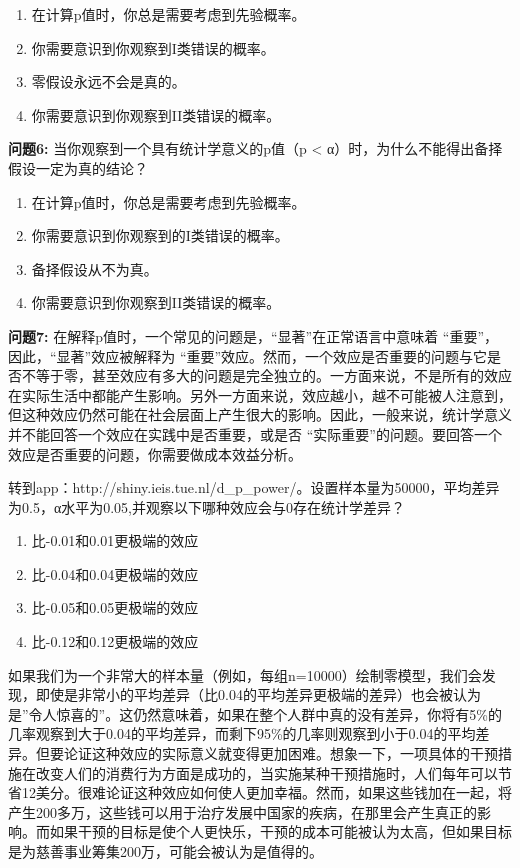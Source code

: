 \documentclass[
  letterpaper,
  DIV=11,
  numbers=noendperiod]{scrreprt}
\providecommand{\tightlist}{%
  \setlength{\itemsep}{0pt}\setlength{\parskip}{0pt}}\usepackage{longtable,booktabs,array}
\begin{document}
\begin{enumerate}
\def\labelenumi{\Alph{enumi})}
\tightlist
\item
  在计算p值时，你总是需要考虑到先验概率。
\item
  你需要意识到你观察到I类错误的概率。
\item
  零假设永远不会是真的。
\item
  你需要意识到你观察到II类错误的概率。
\end{enumerate}

\textbf{问题6:} 当你观察到一个具有统计学意义的p值（p \textless{}
α）时，为什么不能得出备择假设一定为真的结论？

\begin{enumerate}
\def\labelenumi{\Alph{enumi})}
\tightlist
\item
  在计算p值时，你总是需要考虑到先验概率。
\item
  你需要意识到你观察到的I类错误的概率。
\item
  备择假设从不为真。
\item
  你需要意识到你观察到II类错误的概率。
\end{enumerate}

\textbf{问题7:}
在解释p值时，一个常见的问题是，``显著''在正常语言中意味着
``重要''，因此，``显著''效应被解释为
``重要''效应。然而，一个效应是否重要的问题与它是否不等于零，甚至效应有多大的问题是完全独立的。一方面来说，不是所有的效应在实际生活中都能产生影响。另外一方面来说，效应越小，越不可能被人注意到，但这种效应仍然可能在社会层面上产生很大的影响。因此，一般来说，统计学意义并不能回答一个效应在实践中是否重要，或是否
``实际重要''的问题。要回答一个效应是否重要的问题，你需要做成本效益分析。

转到app：http://shiny.ieis.tue.nl/d\_p\_power/。设置样本量为50000，平均差异为0.5，α水平为0.05,并观察以下哪种效应会与0存在统计学差异？

\begin{enumerate}
\def\labelenumi{\Alph{enumi})}
\tightlist
\item
  比-0.01和0.01更极端的效应
\item
  比-0.04和0.04更极端的效应
\item
  比-0.05和0.05更极端的效应
\item
  比-0.12和0.12更极端的效应
\end{enumerate}

如果我们为一个非常大的样本量（例如，每组n=10000）绘制零模型，我们会发现，即使是非常小的平均差异（比0.04的平均差异更极端的差异）也会被认为是''令人惊喜的''。这仍然意味着，如果在整个人群中真的没有差异，你将有5\%的几率观察到大于0.04的平均差异，而剩下95\%的几率则观察到小于0.04的平均差异。但要论证这种效应的实际意义就变得更加困难。想象一下，一项具体的干预措施在改变人们的消费行为方面是成功的，当实施某种干预措施时，人们每年可以节省12美分。很难论证这种效应如何使人更加幸福。然而，如果这些钱加在一起，将产生200多万，这些钱可以用于治疗发展中国家的疾病，在那里会产生真正的影响。而如果干预的目标是使个人更快乐，干预的成本可能被认为太高，但如果目标是为慈善事业筹集200万，可能会被认为是值得的。
\end{document}
